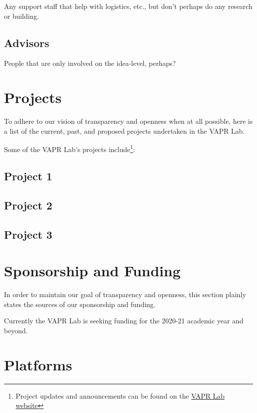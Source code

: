 \documentclass[12pt,]{memoir}
\let\rmarkdownfootnote\footnote%
\def\footnote{\protect\rmarkdownfootnote}
\begin{document}
Any support staff that help with logistics, etc., but don't perhaps do any research or building.

\hypertarget{advisors}{%
\section{Advisors}\label{advisors}}

People that are only involved on the idea-level, perhaps?

\hypertarget{projects}{%
\chapter{Projects}\label{projects}}

To adhere to our vision of transparency and openness when at all possible, here is a list of the current, past, and proposed projects undertaken in the VAPR Lab.

Some of the VAPR Lab's projects include\footnote{Project updates and announcements can be found on the \href{https://VAPR-Lab.github.io/website/}{VAPR Lab website}}:

\hypertarget{project-1}{%
\section{Project 1}\label{project-1}}

\hypertarget{project-2}{%
\section{Project 2}\label{project-2}}

\hypertarget{project-3}{%
\section{Project 3}\label{project-3}}

\hypertarget{funding}{%
\chapter{Sponsorship and Funding}\label{funding}}

In order to maintain our goal of transparency and openness, this section plainly states the sources of our sponsorship and funding.

Currently the VAPR Lab is seeking funding for the 2020-21 academic year and beyond.

\hypertarget{platforms}{%
\chapter{Platforms}\label{platforms}}
\end{document}
